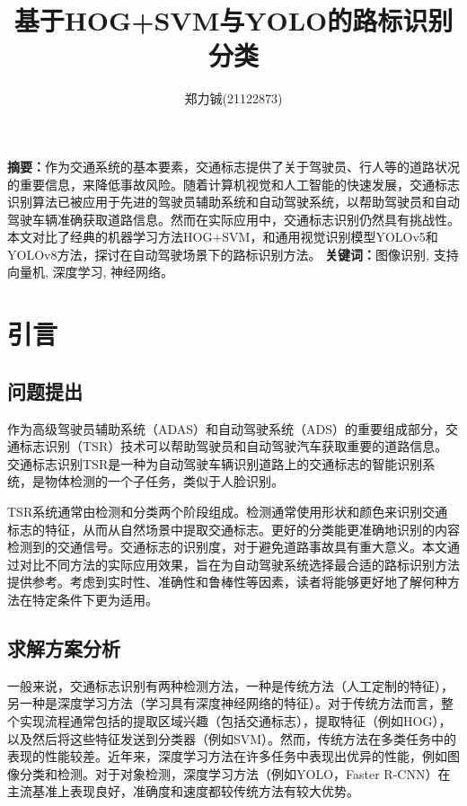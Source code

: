 \documentclass{article}
\title{\textbf{基于HOG+SVM与YOLO的路标识别分类}}
\author{
郑力铖(21122873)
}
\begin{document}
 \songti


\date{}
\maketitle


\begin{center}
    \setlength{\textwidth}{15cm}
    \parbox{\textwidth}{
        \textbf{摘要：}作为交通系统的基本要素，交通标志提供了关于驾驶员、行人等的道路状况的重要信息，来降低事故风险。随着计算机视觉和人工智能的快速发展，交通标志识别算法已被应用于先进的驾驶员辅助系统和自动驾驶系统，以帮助驾驶员和自动驾驶车辆准确获取道路信息。然而在实际应用中，交通标志识别仍然具有挑战性。本文对比了经典的机器学习方法HOG+SVM，和通用视觉识别模型YOLOv5和YOLOv8方法，探讨在自动驾驶场景下的路标识别方法。
        \newline
        \textbf{关键词：}图像识别, 支持向量机, 深度学习, 神经网络。
    }
\end{center}

\section{引言}
\subsection{问题提出}
作为高级驾驶员辅助系统（ADAS）和自动驾驶系统（ADS）的重要组成部分，交通标志识别（TSR）技术可以帮助驾驶员和自动驾驶汽车获取重要的道路信息\cite{chen2022realtime}。交通标志识别TSR是一种为自动驾驶车辆识别道路上的交通标志的智能识别系统，是物体检测的一个子任务，类似于人脸识别。

TSR系统通常由检测和分类两个阶段组成。检测通常使用形状和颜色来识别交通标志的特征，从而从自然场景中提取交通标志。更好的分类能更准确地识别的内容检测到的交通信号。交通标志的识别度，对于避免道路事故具有重大意义\cite{Zhang2017}。本文通过对比不同方法的实际应用效果，旨在为自动驾驶系统选择最合适的路标识别方法提供参考。考虑到实时性、准确性和鲁棒性等因素，读者将能够更好地了解何种方法在特定条件下更为适用。

\subsection{求解方案分析}
一般来说，交通标志识别有两种检测方法，一种是传统方法（人工定制的特征），另一种是深度学习方法（学习具有深度神经网络的特征）。对于传统方法而言，整个实现流程通常包括的提取区域兴趣（包括交通标志），提取特征（例如HOG），以及然后将这些特征发送到分类器（例如SVM）。然而，传统方法在多类任务中的表现的性能较差。近年来，深度学习方法在许多任务中表现出优异的性能，例如图像分类和检测。对于对象检测，深度学习方法（例如YOLO\cite{ref9}，Faster R-CNN\cite{Ren2016}）在主流基准上表现良好，准确度和速度都较传统方法有较大优势。
\end{document}
